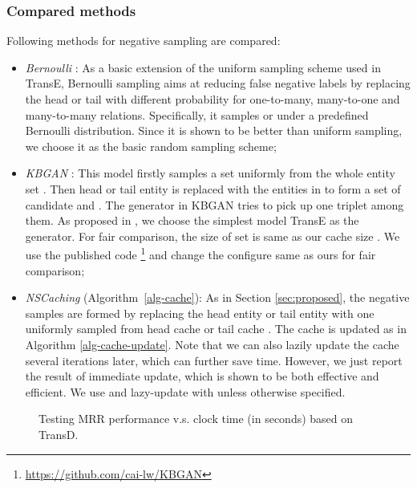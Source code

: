 \documentclass[conference]{IEEEtran}
\begin{document}
\subsubsection{Compared methods}
\label{sssec:methods}

Following methods for negative sampling are compared:
\begin{itemize}
\item \textit{Bernoulli} \cite{wang2014knowledge}:
As a basic extension of the uniform sampling scheme used in TransE, 
Bernoulli sampling aims at reducing false negative labels by replacing the head or tail with different probability for one-to-many, many-to-one and many-to-many relations. 
Specifically, it samples  or  under a predefined Bernoulli distribution. 
Since it is shown to be better than uniform sampling, we choose it as the basic random sampling scheme;


\item \textit{KBGAN} \cite{cai2018kbgan}:
This model firstly samples a set  uniformly from the whole entity set . 
Then head or tail entity is replaced with the entities in   to form a set of candidate   and . 
The generator in KBGAN tries to pick up one triplet among them. As proposed in \cite{cai2018kbgan}, we choose the simplest model TransE as the generator. For fair comparison, the size of set  is same as our cache size .
We use the published code \footnote{\url{https://github.com/cai-lw/KBGAN}} and change the configure same as ours for fair comparison;


\item \textit{NSCaching} (Algorithm~\ref{alg-cache}):
As in Section \ref{sec:proposed}, 
the negative samples are formed by replacing the head entity  or tail entity  with one uniformly sampled from
head cache  or tail cache .
The cache is updated as in Algorithm \ref{alg-cache-update}. 
Note that we can also lazily update the cache several iterations later, which can further save time. 
However, we just report the result of immediate update, which is shown to be both effective and efficient.
We use  and lazy-update with  unless otherwise specified.
\end{itemize}


\begin{figure*}[ht]
	\centering
	
\caption{Testing MRR performance v.s. clock time (in seconds) based on TransD.}
	\label{fig-perf-transd-mrr}
\end{figure*}
\end{document}
